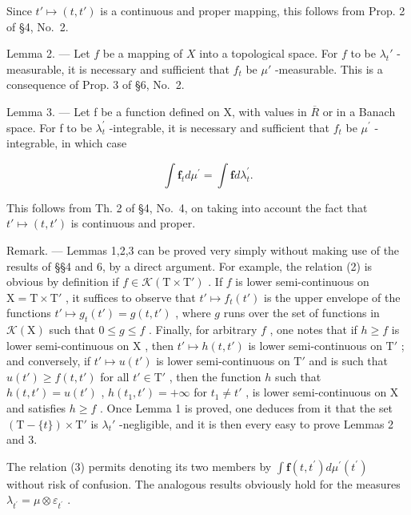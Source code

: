Since \(t' \mapsto (t, t')\) is a continuous and proper mapping, this follows from Prop. 2 of §4, No.~2.

Lemma 2. --- Let \(f\) be a mapping of \(X\) into a topological space. For \(f\) to be \(\lambda_t'\) -measurable, it is necessary and sufficient that \(f_t\) be \(\mu'\) -measurable. This is a consequence of Prop. 3 of §6, No.~2.

Lemma 3. --- Let f be a function defined on X, with values in \(\overline{R}\) or in a Banach space. For f to be \(\lambda_{t}^{\prime}\) -integrable, it is necessary and sufficient that \(f_{t}\) be \(\mu^{\prime}\) -integrable, in which case

\[
\int \mathbf {f} _ {t} d \mu^ {\prime} = \int \mathbf {f} d \lambda_ {t} ^ {\prime}.\tag{3}
\]

This follows from Th. 2 of §4, No.~4, on taking into account the fact that \(t' \mapsto (t, t')\) is continuous and proper.

Remark. --- Lemmas 1,2,3 can be proved very simply without making use of the results of §§4 and 6, by a direct argument. For example, the relation (2) is obvious by definition if \(f \in \mathcal{K}(\mathrm{T} \times \mathrm{T}')\) . If \(f\) is lower semi-continuous on \(\mathrm{X} = \mathrm{T} \times \mathrm{T}'\) , it suffices to observe that \(t' \mapsto f_t(t')\) is the upper envelope of the functions \(t' \mapsto g_t(t') = g(t, t')\) , where \(g\) runs over the set of functions in \(\mathcal{K}(\mathrm{X})\) such that \(0 \leqslant g \leqslant f\) . Finally, for arbitrary \(f\) , one notes that if \(h \geqslant f\) is lower semi-continuous on \(\mathrm{X}\) , then \(t' \mapsto h(t, t')\) is lower semi-continuous on \(\mathrm{T}'\) ; and conversely, if \(t' \mapsto u(t')\) is lower semi-continuous on \(\mathrm{T}'\) and is such that \(u(t') \geqslant f(t, t')\) for all \(t' \in \mathrm{T}'\) , then the function \(h\) such that \(h(t, t') = u(t')\) , \(h(t_1, t') = +\infty\) for \(t_1 \neq t'\) , is lower semi-continuous on \(\mathrm{X}\) and satisfies \(h \geqslant f\) . Once Lemma 1 is proved, one deduces from it that the set \((\mathrm{T} - \{t\}) \times \mathrm{T}'\) is \(\lambda_t'\) -negligible, and it is then every easy to prove Lemmas 2 and 3.

The relation (3) permits denoting its two members by \(\int\mathbf{f}(t,t^{\prime})d\mu^{\prime}(t^{\prime})\) without risk of confusion. The analogous results obviously hold for the measures \(\lambda_{t^{\prime}}=\mu\otimes\varepsilon_{t^{\prime}}\) .

